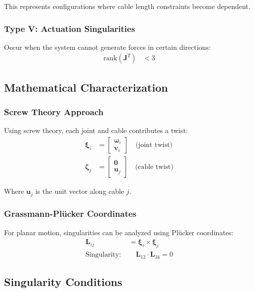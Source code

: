 \documentclass[11pt,a4paper]{article}
\begin{document}
This represents configurations where cable length constraints become dependent.

\subsubsection{Type V: Actuation Singularities}
Occur when the system cannot generate forces in certain directions:
\begin{align}
\text{rank}(\bm{J}^T) &< 3
\end{align}

\subsection{Mathematical Characterization}

\subsubsection{Screw Theory Approach}
Using screw theory, each joint and cable contributes a twist:
\begin{align}
\bm{\xi}_i &= \begin{bmatrix} \bm{\omega}_i \\ \bm{v}_i \end{bmatrix} \quad \text{(joint twist)} \\
\bm{\zeta}_j &= \begin{bmatrix} \bm{0} \\ \bm{u}_j \end{bmatrix} \quad \text{(cable twist)}
\end{align}

Where $\bm{u}_j$ is the unit vector along cable $j$.

\subsubsection{Grassmann-Plücker Coordinates}
For planar motion, singularities can be analyzed using Plücker coordinates:
\begin{align}
\bm{L}_{ij} &= \bm{\xi}_i \times \bm{\xi}_j \\
\text{Singularity: } &\quad \bm{L}_{12} \cdot \bm{L}_{34} = 0
\end{align}



\subsection{Singularity Conditions}
\end{document}
